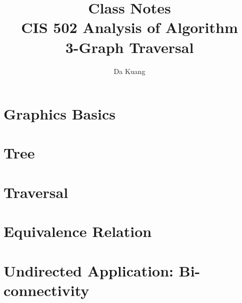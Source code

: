 \documentclass[en,hazy,blue,normal,12pt]{elegantnote}
\title{Class Notes\\CIS 502 Analysis of Algorithm\\3-Graph Traversal}
\author{Da Kuang}
\institute{University of Pennsylvania}
\date{}
\begin{document}
\maketitle
\newpage
\tableofcontents
\newpage

\section{Graphics Basics}


\section{Tree}


\section{Traversal}


\section{Equivalence Relation}


\section{Undirected Application: Bi-connectivity}

\end{document}

